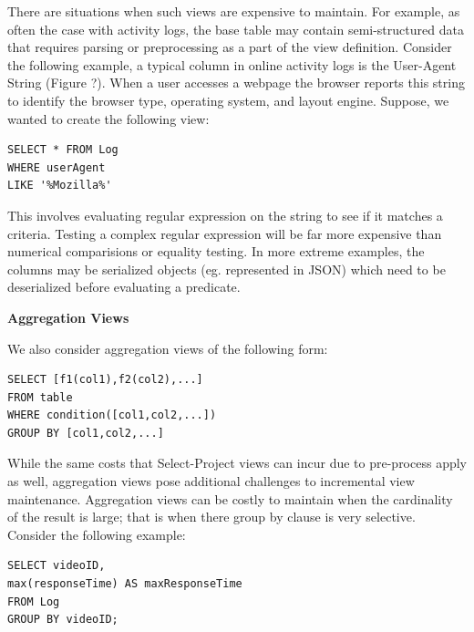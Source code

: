 There are situations when such views are expensive to maintain. For
example, as often the case with activity logs, the base table may
contain semi-structured data that requires parsing or preprocessing
as a part of the view definition. Consider the following example,
a typical column in online activity logs is the User-Agent String
(Figure ?). When a user accesses a webpage the browser reports this
string to identify the browser type, operating system, and layout
engine. Suppose, we wanted to create the following view:

\begin{lstlisting}
SELECT * FROM Log 
WHERE userAgent 
LIKE '%Mozilla%'
\end{lstlisting}

This involves evaluating regular expression on the string to see if
it matches a criteria.
Testing a complex regular expression will be far more expensive than
numerical comparisions or equality testing. In more extreme examples,
the columns may be serialized objects (eg. represented in JSON) which
need to be deserialized before evaluating a predicate.



\vspace{1em}

\noindent\textbf{Aggregation Views}

We also consider aggregation views of the following form:

\begin{lstlisting}
SELECT [f1(col1),f2(col2),...] 
FROM table 
WHERE condition([col1,col2,...]) 
GROUP BY [col1,col2,...]
\end{lstlisting}

While the same costs that Select-Project views can incur due to pre-process
apply as well, aggregation views pose additional challenges to incremental
view maintenance. Aggregation views can be costly to maintain when
the cardinality of the result is large; that is when there group by
clause is very selective. Consider the following example:

\begin{lstlisting}
SELECT videoID, 
max(responseTime) AS maxResponseTime 
FROM Log 
GROUP BY videoID;
\end{lstlisting}

